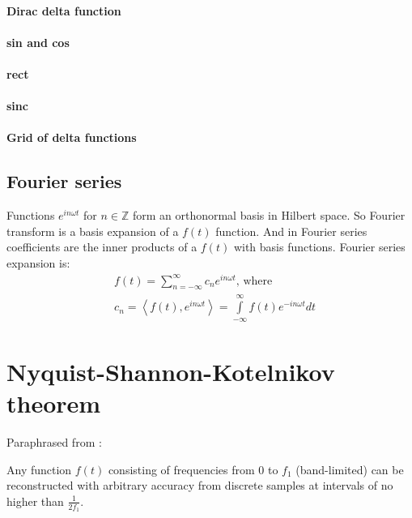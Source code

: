 \documentclass{article}
\begin{document}
\paragraph{Dirac delta function}

\paragraph{sin and cos}

\paragraph{rect}

\paragraph{sinc}

\paragraph{Grid of delta functions}


\subsection{Fourier series}
Functions $e^{i n \omega t}$ for $n \in \mathbb{Z}$ form an orthonormal basis in Hilbert space.
So Fourier transform is a basis expansion of a $f(t)$ function.
And in Fourier series coefficients are the inner products of a $f(t)$ with basis functions.
Fourier series expansion is:
\begin{align*}
    &f(t) = \sum \limits^{\infty}_{n=- \infty} c_n e^{i n \omega t}, \, \text{where} \\
    &c_n = \left< f(t), e^{i n \omega t} \right> = \int \limits^{\infty}_{-\infty} f(t) e^{-i n \omega t}dt
\end{align*}


\section{Nyquist-Shannon-Kotelnikov theorem}

Paraphrased from \cite{nyquist_certain_1928,shannon_communication_1949,kotelnikov_transmission_2006}:
\begin{displayquote}
Any function $f(t)$ consisting of frequencies from $0$ to $f_1$ (band-limited) can be 
reconstructed with arbitrary accuracy from discrete samples at intervals of no higher than $\frac{1}{2f_1}$.
\end{displayquote}
\end{document}
